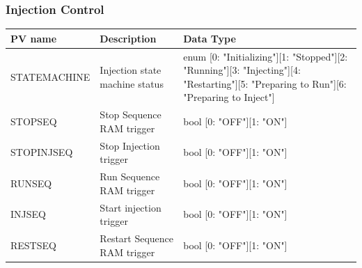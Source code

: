 \documentclass[openany]{article}
\begin{document}
		\subsubsection{Injection Control}\label{pvgroup:evg-injection}
			\begin{center}
			\begin{tabular}{| m{2.8cm} m{6cm} m{6cm} |}
			    \hline
			    \bfseries PV name & \bfseries Description & \bfseries Data Type \\ \hline
			    STATEMACHINE & Injection state machine status & enum [0: "Initializing"][1: "Stopped"][2: "Running"][3: "Injecting"][4: "Restarting"][5: "Preparing to Run"][6: "Preparing to Inject"] \\ \hline
			    STOPSEQ & Stop Sequence RAM trigger & bool [0: "OFF"][1: "ON"] \\ \hline
			    STOPINJSEQ & Stop Injection trigger & bool [0: "OFF"][1: "ON"] \\ \hline
			    RUNSEQ & Run Sequence RAM trigger & bool [0: "OFF"][1: "ON"] \\ \hline
			    INJSEQ & Start injection trigger & bool [0: "OFF"][1: "ON"] \\ \hline
			    RESTSEQ & Restart Sequence RAM trigger & bool [0: "OFF"][1: "ON"] \\ \hline
			\end{tabular}
			\end{center}
\end{document}
